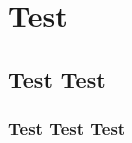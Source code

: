 \documentclass[12pt]{article}
\begin{document}
\tableofcontents
\newpage
\section{\\Test}
\subsection{Test Test}
\subsubsection{Test Test Test}
\end{document}
